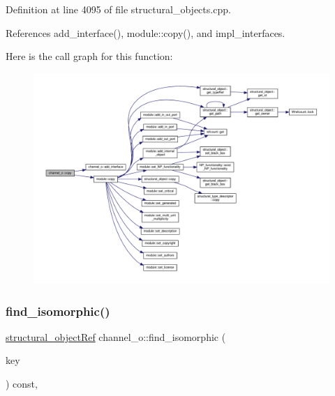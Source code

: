 Definition at line 4095 of file structural\+\_\+objects.\+cpp.



References add\+\_\+interface(), module\+::copy(), and impl\+\_\+interfaces.

Here is the call graph for this function\+:
\nopagebreak
\begin{figure}[H]
\begin{center}
\leavevmode
\includegraphics[width=350pt]{d3/d41/classchannel__o_a1e97d51670c7209f2666fdc5431a40a3_cgraph}
\end{center}
\end{figure}
\mbox{\label{classchannel__o_a7565783de13f5451d94de9fda826710d}} 
\subsubsection{\texorpdfstring{find\+\_\+isomorphic()}{find\_isomorphic()}}
{\footnotesize\ttfamily \hyperlink{structural__objects_8hpp_a8ea5f8cc50ab8f4c31e2751074ff60b2}{structural\+\_\+object\+Ref} channel\+\_\+o\+::find\+\_\+isomorphic (\begin{DoxyParamCaption}\item[{const \hyperlink{structural__objects_8hpp_a8ea5f8cc50ab8f4c31e2751074ff60b2}{structural\+\_\+object\+Ref}}]{key }\end{DoxyParamCaption}) const\hspace{0.3cm}{\ttfamily [override]}, {\ttfamily [virtual]}}



